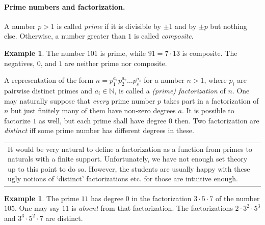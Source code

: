 \documentclass[12pt,notitlepage]{article}
\theoremstyle{plain}
\newtheorem{lemma}[thm]{Lemma}
\theoremstyle{definition}
\newtheorem{exm}[thm]{Example}
\theoremstyle{plain}
\newcommand{\N}{\mathbb{N}}
\newcommand{\1}{\mathbf{1}}
\newcommand{\0}{\mathbf{0}}
\newcommand{\dvd}{\mathop{\mid}}
\newcommand{\mcomm}[1]{
\medskip\noindent\begin{tabular}{| l}
\parbox{0.99\textwidth}{{\small
#1 }}\end{tabular}
\smallskip}
\begin{document}
\paragraph{Prime numbers and factorization.} A number $p > 1$ is called \emph{prime} if it is divisible by $\pm 1$ and by $\pm p$ but nothing else. Otherwise, a number greater than $1$ is called \emph{composite}.

\begin{exm}
The number $101$ is prime, while $91 = 7 \cdot 13$ is composite. The negatives, $0$, and $1$ are neither prime nor composite.
\end{exm}


A representation of the form $n = p_1^{a_1} p_2^{a_2} \ldots p_s^{a_s}$ for a number $n > 1$, where $p_i$ are pairwise distinct primes and $a_i \in \N$, is called a \emph{(prime) factorization} of $n$. One may naturally suppose that \emph{every} prime number $p$ takes part in a factorization of $n$ but just finitely many of them have non-zero degrees $a$. It is possible to factorize $1$ as well, but each prime shall have degree $0$ then. Two factorization are \emph{distinct} iff some prime number has different degrees in these.

\mcomm{It would be very natural to define a factorization as a function from primes to naturals with a finite support. Unfortunately, we have not enough set theory up to this point to do so. However, the students are usually happy with these ugly notions of `distinct' factorizations etc. for those are intuitive enough.}

\begin{exm}
The prime $11$ has degree $0$ in the factorization $3 \cdot 5 \cdot 7$ of the number $105$. One may say $11$ is \emph{absent} from that factorization. The factorizations $2 \cdot 3^2 \cdot 5^3$ and $3^3 \cdot 5^2 \cdot 7$ are distinct.
\end{exm}
\end{document}
